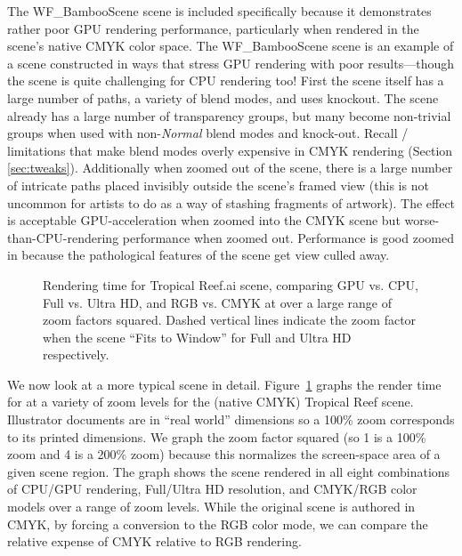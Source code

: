 The WF\_BambooScene scene is included specifically because it demonstrates rather poor GPU rendering performance,
particularly when rendered in the scene's native CMYK color space.
The WF\_BambooScene scene is an example of a scene constructed in ways that stress GPU rendering with poor results---though the scene is quite challenging for CPU rendering too!
First the scene itself has a large number of paths,
a variety of blend modes, and uses knockout.  The scene already has a large number of transparency groups, but many become
non-trivial groups when used with non-{\em Normal} blend modes and knock-out.
Recall \NVbea/ limitations that make blend modes overly expensive in CMYK rendering (Section \ref{sec:tweaks}).
Additionally when zoomed out of the scene, there is a large number of intricate
paths placed invisibly outside the scene's framed view (this is not uncommon for artists to do as
a way of stashing fragments of artwork).  The effect is acceptable GPU-acceleration when zoomed into
the CMYK scene but worse-than-CPU-rendering performance when zoomed out.  Performance is good zoomed
in because the pathological features of the scene get view culled away.

\begin{figure}[tb]
  \caption{\label{fig:zoom-perf}
Rendering time for Tropical Reef.ai scene, comparing GPU vs. CPU, Full vs. Ultra HD, and RGB vs. CMYK at over a large range of zoom factors squared.  Dashed vertical lines indicate the zoom factor when the scene ``Fits to Window'' for Full and Ultra HD respectively.
}
\end{figure}

We now look at a more typical scene in detail.
Figure~\ref{fig:zoom-perf} graphs the render time for at a variety of zoom levels
for the (native CMYK) Tropical Reef scene.  Illustrator documents are in ``real world''
dimensions so a 100\% zoom corresponds to its printed dimensions.  We graph the zoom factor squared
(so 1 is a 100\% zoom and 4 is a 200\% zoom) because this normalizes the screen-space area of a given scene region.
The graph shows the scene rendered in
all eight combinations of CPU/GPU rendering, Full/Ultra HD resolution, and CMYK/RGB color models
over a range of zoom levels.  While the original scene is authored in CMYK, by forcing a conversion
to the RGB color mode, we can compare the relative expense of CMYK relative to RGB rendering.

